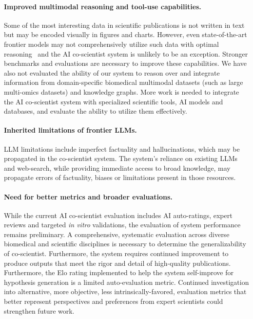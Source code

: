 \paragraph{Improved multimodal reasoning and tool-use capabilities.} Some of the most interesting data in scientific publications is not written in text but may be encoded visually in figures and charts. However, even state-of-the-art frontier models may not comprehensively utilize such data with optimal  reasoning~\citep{roberts2024scifibench} and the AI co-scientist system is unlikely to be an exception. Stronger benchmarks and evaluations are necessary to improve these capabilities. We have also not evaluated the ability of our system to reason over and integrate information from domain-specific biomedical multimodal datasets (such as large multi-omics datasets) and knowledge graphs. More work is needed to integrate the AI co-scientist system with specialized scientific tools, AI models and databases, and evaluate the ability to utilize them effectively.

\paragraph{Inherited limitations of frontier LLMs.} LLM limitations include imperfect factuality and hallucinations, which may be propagated in the co-scientist system. The system's reliance on existing LLMs and web-search, while providing immediate access to broad knowledge, may propagate errors of factuality, biases or limitations present in those resources.

\paragraph{Need for better metrics and broader evaluations.} While the current AI co-scientist evaluation includes AI auto-ratings, expert reviews and targeted \textit{in vitro} validations, the evaluation of system performance remains preliminary. A comprehensive, systematic evaluation across diverse biomedical and scientific disciplines is necessary to determine the generalizability of co-scientist. Furthermore, the system requires continued improvement to produce outputs that meet the rigor and detail of high-quality publications. Furthermore, the Elo rating implemented to help the system self-improve for hypothesis generation is a limited auto-evaluation metric. Continued investigation into alternative, more objective, less intrinsically-favored, evaluation metrics that better represent perspectives and preferences from expert scientists could strengthen future work.

